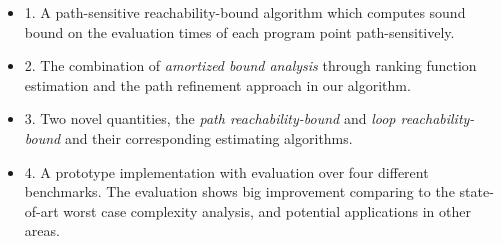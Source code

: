 \begin{itemize}
  \item 
1. A path-sensitive reachability-bound algorithm which computes sound bound on the evaluation times of each program point path-sensitively.
 \item 
2. The combination of \emph{amortized bound analysis} through ranking function estimation and the path refinement approach in our algorithm.
\item 
3. Two novel quantities, the \emph{path reachability-bound} and \emph{loop reachability-bound} and their corresponding estimating algorithms.
\item 
4. A prototype implementation with evaluation over four different benchmarks.
  The evaluation shows big improvement comparing to the state-of-art worst case complexity analysis, and potential applications in other areas.
\end{itemize}